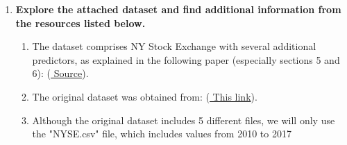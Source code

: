 \documentclass[12pt]{article}
\begin{document}



\pagebreak

\begin{enumerate}

\item \textbf{Explore the attached dataset and find additional information from the resources listed below.}
\begin{enumerate}
\item The dataset comprises NY Stock Exchange with several additional predictors, as explained in the following paper (especially sections 5 and 6):  (\href{https://www.sciencedirect.com/science/article/abs/pii/S0957417419301915}{ Source}).
\item The original dataset was obtained from: (\href{https://archive.ics.uci.edu/ml/datasets/CNNpred\%3A+CNN-based+stock+market+prediction+using+a+diverse+set+of+variablesc}{ This link}).
\item Although the original dataset includes 5 different files, we will only use the "NYSE.csv" file, which includes values from 2010 to 2017
\end{enumerate}




\newpage

\newpage

\newpage

%









\end{enumerate}
\end{document}
